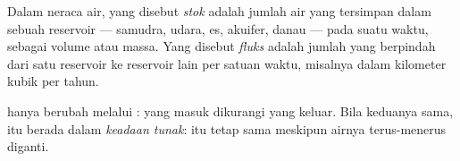 \begin{definition}\label{def:g10:freshwater-resources:stock}
Dalam neraca air, yang disebut \emph{stok} adalah jumlah air
yang tersimpan dalam sebuah reservoir --- samudra, udara, es, akuifer, danau
--- pada suatu waktu, sebagai volume atau massa. Yang disebut
\emph{fluks} adalah jumlah yang berpindah dari satu
reservoir ke reservoir lain per satuan waktu, misalnya dalam kilometer kubik
per tahun.
\end{definition}

 hanya berubah melalui : yang masuk dikurangi yang keluar.
Bila keduanya sama,  itu berada dalam \emph{keadaan tunak}:  itu tetap
sama meskipun airnya terus-menerus diganti.

